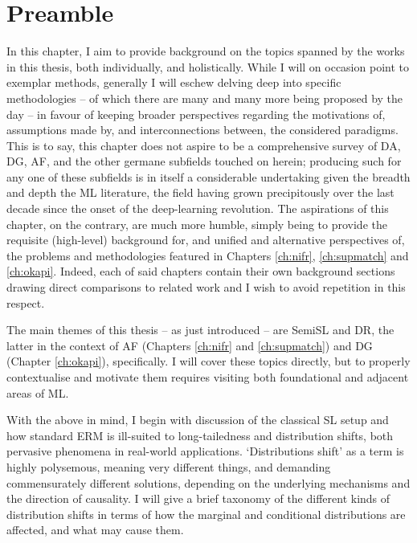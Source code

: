 \section*{Preamble}
%
In this chapter, I aim to provide background on the topics spanned by the works in this thesis,
both individually, and holistically.
%
While I will on occasion point to exemplar methods, generally I will eschew delving deep into
specific methodologies -- of which there are many and many more being proposed by the day -- in
favour of keeping broader perspectives regarding the motivations of, assumptions made by, and
interconnections between, the considered paradigms. 
%
This is to say, this chapter does not aspire to be a comprehensive survey of \ac{DA}, \ac{DG},
\ac{AF}, and the other germane subfields touched on herein; producing such for any one of these
subfields is in itself a considerable undertaking given the breadth and depth the \ac{ML}
literature, the field having grown precipitously over the last decade since the onset of the
deep-learning revolution.
%
The aspirations of this chapter, on the contrary, are much more humble, simply being to provide the
requisite (high-level) background for, and unified and alternative perspectives of, the problems
and methodologies featured in Chapters \ref{ch:nifr}, \ref{ch:supmatch} and \ref{ch:okapi}.
%
Indeed, each of said chapters contain their own background sections drawing direct comparisons to
related work and I wish to avoid repetition in this respect.

The main themes of this thesis -- as just introduced -- are \ac{SemiSL} and \ac{DR}, the latter in
the context of \ac{AF} (Chapters \ref{ch:nifr} and \ref{ch:supmatch}) and \ac{DG} (Chapter
\ref{ch:okapi}), specifically. 
%
I will cover these topics directly, but to properly contextualise and motivate them requires
visiting both foundational and adjacent areas of \ac{ML}.

%
With the above in mind, I begin with discussion of the classical \ac{SL} setup and how standard
\ac{ERM} is ill-suited to long-tailedness and distribution shifts, both pervasive phenomena in
real-world applications. 
%
`Distributions shift' as a term is highly polysemous, meaning very different things, and demanding
commensurately different solutions, depending on the underlying mechanisms and the direction of
causality. 
%
I will give a brief taxonomy of the different kinds of distribution shifts in terms of how the
marginal and conditional distributions are affected, and what may cause them. 

